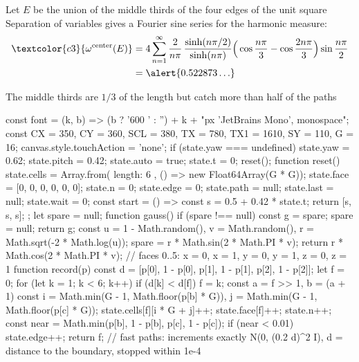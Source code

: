 Let $E$ be the union of the \textcolor{c4}{middle thirds} of the four edges of the unit square
\medskip
Separation of variables gives a Fourier sine series for the harmonic measure:
$$\begin{aligned}\textcolor{c3}{\omega^{\text{center}}(E)}&=4\sum_{n=1}^\infty\frac{2}{n\pi}\,\frac{\sinh(n\pi/2)}{\sinh(n\pi)}\Big(\cos\frac{n\pi}{3}-\cos\frac{2n\pi}{3}\Big)\sin\frac{n\pi}{2}\\&=\alert{0.522873\ldots}\end{aligned}$$
\begin{center}
The middle thirds are $1/3$ of the length but catch more than half of the paths
\end{center}

\begin{js}[size=1640x700, frames=1, alt="Interactive: Brownian paths in a cube drawn in three dimensions; the faces are colored by how often paths exit there, with a slider moving the starting point from the center toward a corner; drag to rotate"]
const font = (k, b) => (b ? '600 ' : '') + k + "px 'JetBrains Mono', monospace";
const CX = 350, CY = 360, SCL = 380, TX = 780, TX1 = 1610, SY = 110, G = 16;
canvas.style.touchAction = 'none';
if (state.yaw === undefined) { state.yaw = 0.62; state.pitch = 0.42; state.auto = true; state.t = 0; reset(); }
function reset() {
  state.cells = Array.from({ length: 6 }, () => new Float64Array(G * G)); state.face = [0, 0, 0, 0, 0, 0];
  state.n = 0; state.edge = 0; state.path = null; state.last = null; state.wait = 0;
}
const start = () => { const s = 0.5 + 0.42 * state.t; return [s, s, s]; };
let spare = null;
function gauss() {
  if (spare !== null) { const g = spare; spare = null; return g; }
  const u = 1 - Math.random(), v = Math.random(), r = Math.sqrt(-2 * Math.log(u));
  spare = r * Math.sin(2 * Math.PI * v); return r * Math.cos(2 * Math.PI * v);
}
// faces 0..5: x = 0, x = 1, y = 0, y = 1, z = 0, z = 1
function record(p) {
  const d = [p[0], 1 - p[0], p[1], 1 - p[1], p[2], 1 - p[2]];
  let f = 0; for (let k = 1; k < 6; k++) if (d[k] < d[f]) f = k;
  const a = f >> 1, b = (a + 1) %
  const i = Math.min(G - 1, Math.floor(p[b] * G)), j = Math.min(G - 1, Math.floor(p[c] * G));
  state.cells[f][i * G + j]++; state.face[f]++; state.n++;
  const near = Math.min(p[b], 1 - p[b], p[c], 1 - p[c]); if (near < 0.01) state.edge++;
  return f;
}
// fast paths: increments exactly N(0, (0.2 d)^2 I), d = distance to the boundary, stopped within 1e-4

\end{js}
